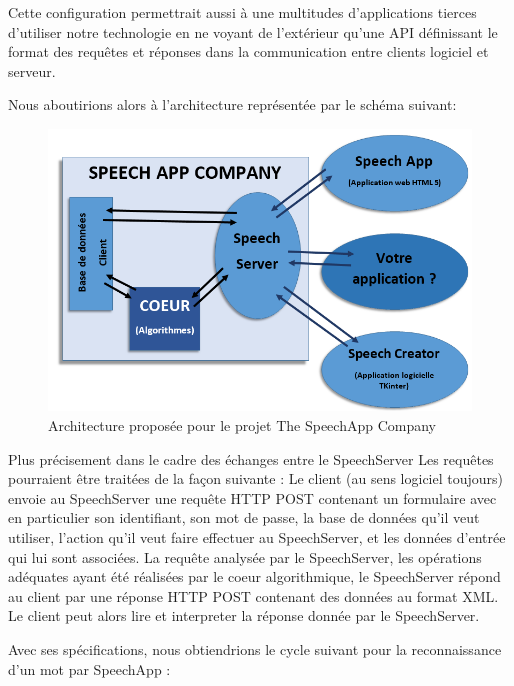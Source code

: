 \documentclass[a4paper,12pt]{report}
\begin{document}
\medskip

Cette configuration permettrait aussi à une multitudes d'applications tierces d'utiliser notre technologie en ne voyant de l'extérieur qu'une API définissant le format des requêtes et réponses dans la communication entre clients logiciel et serveur.

\medskip

Nous aboutirions alors à l'architecture représentée par le schéma suivant:

\begin{figure}[H]
	\begin{center}
	\includegraphics[width=14cm]{pics/architecture.png} 
	\end{center}
	\caption{Architecture proposée pour le projet The SpeechApp Company}
\end{figure}

Plus précisement dans le cadre des échanges entre le SpeechServer
Les requêtes pourraient être traitées de la façon suivante :
Le client (au sens logiciel toujours) envoie au SpeechServer une requête HTTP POST contenant un formulaire avec en particulier son identifiant, son mot de passe, la base de données qu'il veut utiliser, l'action qu'il veut faire effectuer au SpeechServer, et les données d'entrée qui lui sont associées.
La requête analysée par le SpeechServer, les opérations adéquates ayant été réalisées par le coeur algorithmique, le SpeechServer répond au client par une réponse HTTP POST contenant des données au format XML.
Le client peut alors lire et interpreter la réponse donnée par le SpeechServer.

\bigskip

Avec ses spécifications, nous obtiendrions le cycle suivant pour la reconnaissance d'un mot par SpeechApp :
\end{document}
